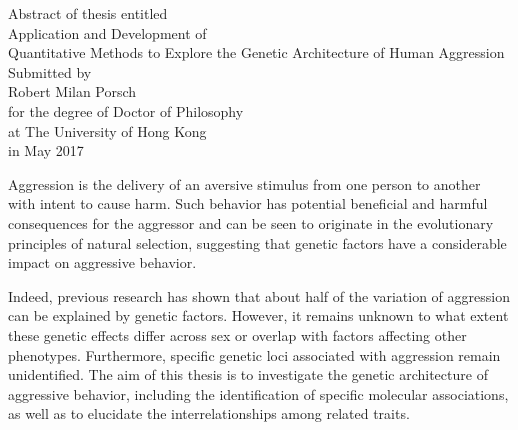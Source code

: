\documentclass[header.tex]{subfiles}
\begin{document}
\begin{center}
  Abstract of thesis entitled \\
  \vspace*{\baselineskip}
  {\LARGE Application and Development of \\ Quantitative Methods to Explore the Genetic Architecture of Human Aggression}\\[0.2\baselineskip]
  \vspace*{\baselineskip}
  Submitted by\\
  \vspace*{\baselineskip}
  {\LARGE Robert Milan Porsch}\\
  \vspace*{\baselineskip}
  for the degree of Doctor of Philosophy \\ at The University of Hong Kong \\ in May 2017
\end{center}



Aggression is the delivery of an aversive stimulus from one person to another with intent to cause harm.
Such behavior has potential beneficial and harmful consequences for the aggressor and can be seen to originate in the evolutionary principles of natural selection,
suggesting that genetic factors have a considerable impact on aggressive behavior.

Indeed, previous research has shown that about half of the variation of aggression can be explained by genetic factors.
However, it remains unknown to what extent these genetic effects differ across sex or overlap with factors affecting other phenotypes.
Furthermore, specific genetic loci associated with aggression remain unidentified.
The aim of this thesis is to investigate the  genetic architecture of aggressive behavior, including the identification of specific molecular associations, as well as to elucidate the interrelationships among related traits. 
\end{document}
